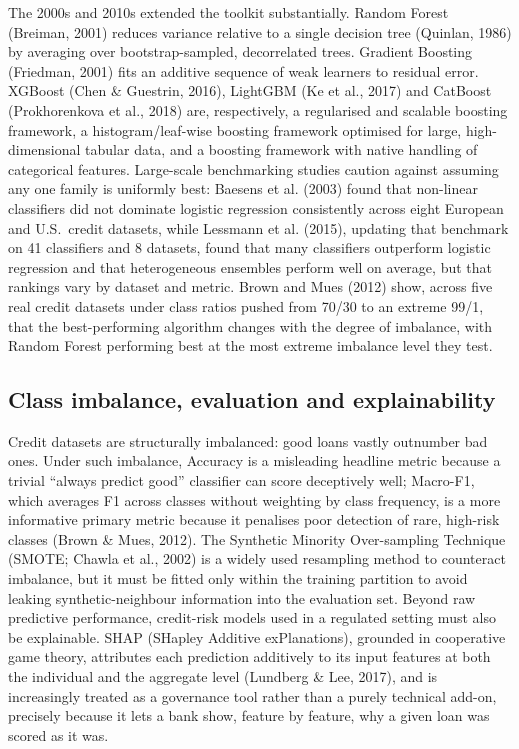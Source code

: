 \documentclass[11pt,a4paper]{article}
\begin{document}
The 2000s and 2010s extended the toolkit substantially. Random Forest (Breiman, 2001) reduces variance relative to a single decision tree (Quinlan, 1986) by averaging over bootstrap-sampled, decorrelated trees. Gradient Boosting (Friedman, 2001) fits an additive sequence of weak learners to residual error. XGBoost (Chen \& Guestrin, 2016), LightGBM (Ke et al., 2017) and CatBoost (Prokhorenkova et al., 2018) are, respectively, a regularised and scalable boosting framework, a histogram/leaf-wise boosting framework optimised for large, high-dimensional tabular data, and a boosting framework with native handling of categorical features. Large-scale benchmarking studies caution against assuming any one family is uniformly best: Baesens et al. (2003) found that non-linear classifiers did not dominate logistic regression consistently across eight European and U.S.\ credit datasets, while Lessmann et al. (2015), updating that benchmark on 41 classifiers and 8 datasets, found that many classifiers outperform logistic regression and that heterogeneous ensembles perform well on average, but that rankings vary by dataset and metric. Brown and Mues (2012) show, across five real credit datasets under class ratios pushed from 70/30 to an extreme 99/1, that the best-performing algorithm changes with the degree of imbalance, with Random Forest performing best at the most extreme imbalance level they test.

\subsection{Class imbalance, evaluation and explainability}

Credit datasets are structurally imbalanced: good loans vastly outnumber bad ones. Under such imbalance, Accuracy is a misleading headline metric because a trivial ``always predict good'' classifier can score deceptively well; Macro-F1, which averages F1 across classes without weighting by class frequency, is a more informative primary metric because it penalises poor detection of rare, high-risk classes (Brown \& Mues, 2012). The Synthetic Minority Over-sampling Technique (SMOTE; Chawla et al., 2002) is a widely used resampling method to counteract imbalance, but it must be fitted only within the training partition to avoid leaking synthetic-neighbour information into the evaluation set. Beyond raw predictive performance, credit-risk models used in a regulated setting must also be explainable. SHAP (SHapley Additive exPlanations), grounded in cooperative game theory, attributes each prediction additively to its input features at both the individual and the aggregate level (Lundberg \& Lee, 2017), and is increasingly treated as a governance tool rather than a purely technical add-on, precisely because it lets a bank show, feature by feature, why a given loan was scored as it was.
\end{document}

